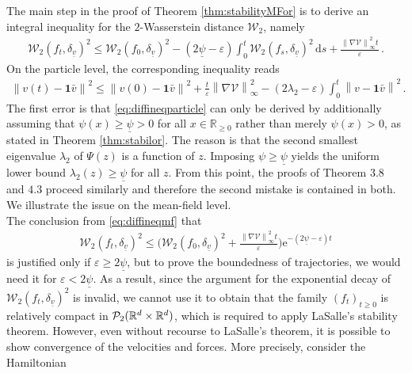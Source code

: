 \documentclass[11pt]{article}
\newcommand{\R}[0]{\mathbb R}
\newcommand{\norm}[1]{\left\| #1 \right\|}
\newcommand{\Pp}[1]{
    \ifx #1\infty
        \mathcal{P}_{c}
    \else 
        \mathcal{P}_{#1}
    \fi 
}
\newcommand{\Wpdist}{\mathcal{W}}
\begin{document}
\begin{bibunit}[unsrtnat]
The main step in the proof of Theorem \ref{thm:stabilityMFor} is to derive an integral inequality for the $2$-Wasserstein distance $\Wpdist_2$, namely 
\begin{align}
     \Wpdist_{2} (f_t, \delta_{\underline{v}} )^2 \leq \Wpdist_{2} (f_0, \delta_{\underline{v}} )^2 - (2\underline{\psi} - \varepsilon) \int_0^t \Wpdist_2(f_s, \delta_{\underline{v}} )^2 \, \mathrm{d}s + \frac{\norm{\nabla \mathcal{V}}_\infty^2 t }{\varepsilon} \, . \label{eq:diffineqmf}
\end{align}
On the particle level, the corresponding inequality reads
\begin{align}
    \norm{v(t) - \textbf{1} \bar{v} }^2  \leq \norm{v(0) - \textbf{1} \bar{v} }^2 + \frac{t}{\varepsilon} \norm{\nabla \mathcal{V}}_\infty^2 - (2 \lambda_2 - \varepsilon) \int_0^t \norm{v - \textbf{1} \bar{v}}^2 \label{eq:diffineqparticle} \, .
\end{align}
The first error is that \eqref{eq:diffineqparticle} can only be derived by additionally assuming that $\psi(x) \geq \underline{\psi} > 0$ for all $ x \in \R_{\geq 0}$ rather than merely $\psi(x) > 0$, as stated in Theorem \ref{thm:stabilor}. The reason is that the second smallest eigenvalue $\lambda_2$ of $\Psi(z)$ is a function of $z$. Imposing $\psi \geq \underline{\psi}$ yields the uniform lower bound $\lambda_2(z) \geq \underline{\psi}$ for all $z$.
From this point, the proofs of Theorem $3.8$ and $4.3$ proceed similarly and therefore the second mistake is contained in both. We illustrate the issue on the mean-field level. \\ 
The conclusion from \eqref{eq:diffineqmf} that 
\begin{align*}
    \Wpdist_{2} (f_t, \delta_{\underline{v}} )^2 \leq \Big( \Wpdist_{2} (f_0, \delta_{\underline{v}} )^2 + \frac{\norm{\nabla \mathcal{V}}_\infty^2 t }{\varepsilon} \Big) \mathrm{e}^{-(2 \underline{\psi} - \varepsilon) t}
\end{align*}
is justified only if $\varepsilon \geq 2 \underline{\psi}$, but to prove the boundedness of trajectories, we would need it for $\varepsilon < 2\underline{\psi}$. 
As a result, since the argument for the exponential decay of $\Wpdist_{2} (f_t, \delta_{\underline{v}} )^2$ is invalid, we cannot use it to obtain that the family $(f_t)_{t \geq 0}$ is relatively compact in $\Pp{2}(\R^d \times \R^d)$, which is required to apply LaSalle's stability theorem. However, even without recourse to LaSalle's theorem, it is possible to show convergence of the velocities and forces. More precisely, consider the Hamiltonian 

\end{bibunit}
\end{document}

